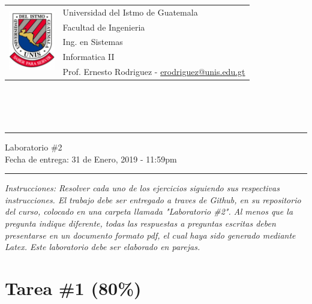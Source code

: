 \documentclass{article}
\newcommand{\horrule}[1]{\rule{\linewidth}{#1}}
\begin{document}
\begin{tabular}{l l}
\multirow{5}{*}{\includegraphics[width=2cm]{../../recursos/logo.png}} & Universidad del Istmo de Guatemala \\
 & Facultad de Ingenieria \\
 & Ing. en Sistemas \\
 & Informatica II \\
 & Prof. Ernesto Rodriguez - \href{mailto:erodriguez@unis.edu.gt}{erodriguez@unis.edu.gt} \\
\end{tabular}
\\\\\\

\begin{center}
        \horrule{0.5pt}
        \huge{Laboratorio \#2} \\
        \large{Fecha de entrega: 31 de Enero, 2019 - 11:59pm} \\
        \horrule{1pt}
\end{center}

\emph{Instrucciones: Resolver cada uno de los ejercicios siguiendo sus respectivas
instrucciones. El trabajo debe ser entregado a traves de Github, en su repositorio del curso, colocado en una carpeta llamada "Laboratorio \#2".
Al menos que la pregunta indique diferente, todas las respuestas a preguntas escritas deben presentarse en
un documento formato pdf, el cual haya sido generado mediante Latex. Este laboratorio
debe ser elaborado en parejas.}

\section*{Tarea \#1 (80\%)}
\end{document}
